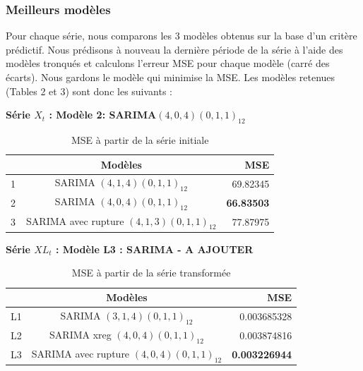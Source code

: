 \documentclass[12pt,a4paper]{book}
\newcommand{\1}{\mathds{1}}
\begin{document}
\subsubsection{Meilleurs modèles}

Pour chaque série, nous comparons les 3 modèles obtenus sur la base d'un critère prédictif. Nous prédisons à nouveau la dernière période de la série à l'aide des modèles tronqués et calculons l'erreur MSE pour chaque modèle (carré des écarts). Nous gardons le modèle qui minimise la MSE.
Les modèles retenues (Tables 2 et 3) sont donc les suivants : 

\textbf{Série $X_t$ : Modèle 2: SARIMA$(4,0,4)(0,1,1)_{12}$}

\begin{table}[h!]
  \begin{center}
    \caption{MSE à partir de la série initiale}
    \label{tab:table1}
    \begin{tabular}{l|c|r} 
      \ & \textbf{Modèles} & \textbf{MSE}\\
      \hline
      1 & SARIMA $(4,1,4)(0,1,1)_{12}$ & 69.82345\\
      \rowcolor{LightCyan}
      2 & SARIMA $(4,0,4)(0,1,1)_{12}$& \textbf{66.83503}\\
      3 & SARIMA avec rupture $(4,1,3)(0,1,1)_{12}$ & 77.87975\\
    \end{tabular}
  \end{center}
\end{table}

\textbf{Série $XL_t$ : Modèle L3 : SARIMA -  A AJOUTER}

\begin{table}[h!]
  \begin{center}
    \caption{MSE à partir de la série transformée}
    \label{tab:table1}
    \begin{tabular}{l|c|r} 
      \ & \textbf{Modèles} & \textbf{MSE}\\
      \hline
      L1 & SARIMA $(3,1,4)(0,1,1)_{12}$ & 0.003685328\\
      L2 & SARIMA xreg $(4,0,4)(0,1,1)_{12}$& 0.003874816\\
      \rowcolor{LightCyan}
      L3 & SARIMA avec rupture $(4,0,4)(0,1,1)_{12}$& \textbf{0.003226944}\\
    \end{tabular}
  \end{center}
\end{table}
\end{document}
